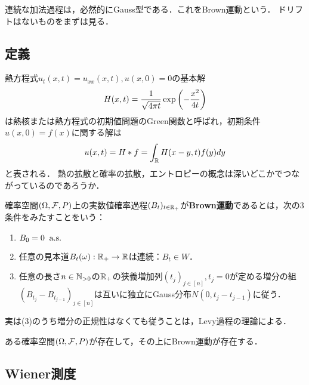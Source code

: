 \documentclass[uplatex,dvipdfmx]{jsreport}
\begin{document}
\begin{tcolorbox}[colframe=ForestGreen, colback=ForestGreen!10!white,breakable,colbacktitle=ForestGreen!40!white,coltitle=black,fonttitle=\bfseries\sffamily,
title=]
    連続な加法過程は，必然的にGauss型である．これをBrown運動という．
    ドリフトはないものをまずは見る．
\end{tcolorbox}

\subsection{定義}

\begin{tcolorbox}[colframe=ForestGreen, colback=ForestGreen!10!white,breakable,colbacktitle=ForestGreen!40!white,coltitle=black,fonttitle=\bfseries\sffamily,
title=]
    熱方程式$u_t(x,t)=u_{xx}(x,t),u(x,0)=0$の基本解
    \[H(x,t)=\frac{1}{\sqrt{4\pi t}}\exp\left(-\frac{x^2}{4t}\right)\]
    は熱核または熱方程式の初期値問題のGreen関数と呼ばれ，初期条件$u(x,0)=f(x)$に関する解は
    \[u(x,t)=H*f=\int_{\mathbb{R}} H(x-y,t)f(y)dy\]
    と表される．
    熱の拡散と確率の拡散，エントロピーの概念は深いどこかでつながっているのであろうか．
\end{tcolorbox}

\begin{definition}
    確率空間$(\Omega,\mathcal{F},P)$上の実数値確率過程$(B_t)_{t\in\mathbb{R}_+}$が\textbf{Brown運動}であるとは，次の3条件をみたすことをいう：
    \begin{enumerate}
        \item $B_0=0\;\;\mathrm{a.s.}$
        \item 任意の見本道$B_t(\omega):\mathbb{R}_+\to\mathbb{R}$は連続：$B_t\in W$．
        \item 任意の長さ$n\in\mathbb{N}_{>0}$の$\mathbb{R}_+$の狭義増加列$(t_j)_{j\in[n]},t_j=0$が定める増分の組$(B_{t_j}-B_{t_{j-1}})_{j\in[n]}$は互いに独立にGauss分布$N(0,t_{j}-t_{j-1})$に従う．
    \end{enumerate}
\end{definition}
\begin{remarks}
    実は(3)のうち増分の正規性はなくても従うことは，Levy過程の理論による．
\end{remarks}

\begin{theorem}[Brown運動の存在]\label{thm-existence-of-Brownian-motion}
    ある確率空間$(\Omega,\mathcal{F},P)$が存在して，その上にBrown運動が存在する．
\end{theorem}

\subsection{Wiener測度}
\end{document}
